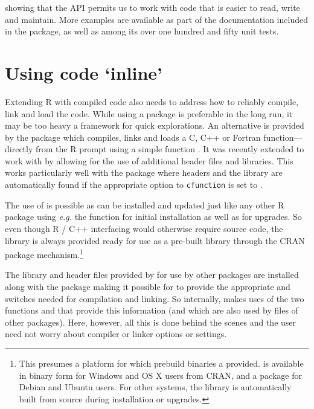 showing that the  API permits us to work with code that is easier
to read, write and maintain. More examples are available as part of the documentation
included in the  package, as well as among its over one hundred and
fifty unit tests.

\section{Using code `inline'}
\label{sec:inline}

Extending R with compiled code also needs to address how to reliably compile,
link and load the code.  While using a package is preferable in the long run,
it may be too heavy a framework for quick explorations.  An alternative is
provided by the  package \citep{cran:inline} which compiles,
links and loads a C, C++ or Fortran function---directly from the R prompt
using a simple function .  It was recently extended to work
with  by allowing for the use of additional header files and
libraries. This works particularly well with the  package where
headers and the library are automatically found if the appropriate option
 to \texttt{cfunction} is set to .

The use of  is possible as  can be installed and
updated just like any other R package using \textsl{e.g.} the
 function for initial installation as well as
 for upgrades.  So even though R / C++ interfacing
would otherwise require source code, the  library is always provided
ready for use as a pre-built library through the CRAN package
mechanism.\footnote{This presumes a platform for which prebuild binaries a
  provided.  is available in binary form for Windows and OS X users from
  CRAN, and a  package for Debian and Ubuntu users. For other systems, the
   library is automatically built from source during installation
  or upgrades.}

The library and header files provided by  for use by other packages
are installed along with the  package making it possible for
 to provide the appropriate  and  switches needed
for compilation and linking.  So internally,  makes uses of the
two functions  and  that
provide this information (and which are also used by  files of
other packages).  Here, however, all this is done behind the scenes and the
user need not worry about compiler or linker options or settings.

